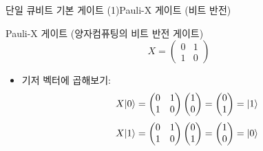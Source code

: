 \documentclass[aspectratio=169, 10pt]{beamer}
\begin{document}
\begin{frame}{단일 큐비트 기본 게이트 (1)}{Pauli-X 게이트 (비트 반전)}
    \begin{block}{Pauli-X 게이트 (양자컴퓨팅의 비트 반전 게이트)}
        $$X = \begin{pmatrix} 0 & 1 \\ 1 & 0 \end{pmatrix}$$ \pause
        \begin{itemize}
            \item 기저 벡터에 곱해보기:
            $$X|0\rangle = \begin{pmatrix} 0 & 1 \\ 1 & 0 \end{pmatrix}\begin{pmatrix} 1 \\ 0 \end{pmatrix} = \begin{pmatrix} 0 \\ 1 \end{pmatrix} = |1\rangle$$
            $$X|1\rangle = \begin{pmatrix} 0 & 1 \\ 1 & 0 \end{pmatrix}\begin{pmatrix} 0 \\ 1 \end{pmatrix} = \begin{pmatrix} 1 \\ 0 \end{pmatrix} = |0\rangle$$
        \end{itemize}
    \end{block}
\end{frame}
\end{document}
